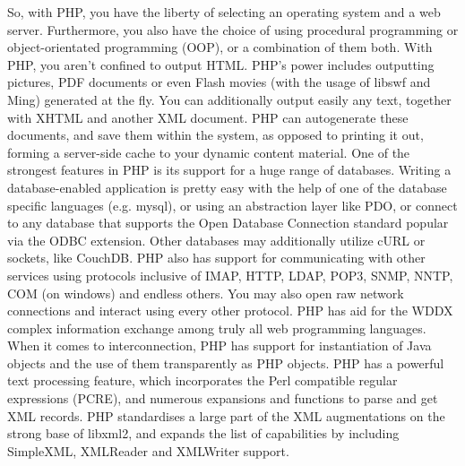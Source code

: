\documentclass[../thesis.tex]{subfiles}
\begin{document}
So, with PHP, you have the liberty of selecting an operating system and a web server. Furthermore, you also have the choice of using procedural programming or object-orientated programming (OOP), or a combination of them both.
\vspace{5mm}
With PHP, you aren't confined to output HTML. PHP's power includes outputting pictures, PDF documents or even Flash movies (with the usage of libswf and Ming) generated at the fly. You can additionally output easily any text, together with XHTML and another XML document. PHP can autogenerate these documents, and save them within the system, as opposed to printing it out, forming a server-side cache to your dynamic content material.
\vspace{5mm}
One of the strongest features in PHP is its support for a huge range of databases. Writing a database-enabled application is pretty easy with the help of one of the database specific languages (e.g. mysql), or using an abstraction layer like PDO, or connect to any database that supports the Open Database Connection standard popular via the ODBC extension. Other databases may additionally utilize cURL or sockets, like CouchDB.
\vspace{5mm}
PHP also has support for communicating with other services using protocols inclusive of IMAP, HTTP, LDAP, POP3, SNMP, NNTP, COM (on windows) and endless others. You may also open raw network connections and interact using every other protocol. PHP has aid for the WDDX complex information exchange among truly all web programming languages. When it comes to interconnection, PHP has support for instantiation of Java objects and the use of them transparently as PHP objects.
\vspace{5mm}
PHP has a powerful text processing feature, which incorporates the Perl compatible regular expressions (PCRE), and numerous expansions and functions to parse and get XML records. PHP standardises a large part of the XML augmentations on the strong base of libxml2, and expands the list of capabilities by including SimpleXML, XMLReader and XMLWriter support.
\end{document}
